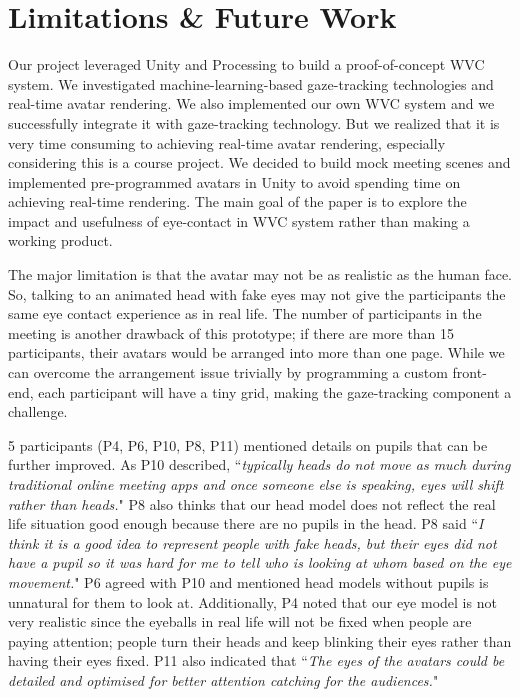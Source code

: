 
\section{Limitations \& Future Work}\label{section:lim}

Our project leveraged Unity and Processing to build a proof-of-concept WVC system. We investigated machine-learning-based gaze-tracking technologies and real-time avatar rendering. We also implemented our own WVC system and we successfully integrate it with gaze-tracking technology. But we realized that it is very time consuming to achieving real-time avatar rendering, especially considering this is a course project. We decided to build mock meeting scenes and implemented pre-programmed avatars in Unity to avoid spending time on achieving real-time rendering. The main goal of the paper is to explore the impact and usefulness of eye-contact in WVC system rather than making a working product.

The major limitation is that the avatar may not be as realistic as the human face. So, talking to an animated head with fake eyes may not give the participants the same eye contact experience as in real life. The number of participants in the meeting is another drawback of this prototype; if there are more than 15 participants, their avatars would be arranged into more than one page. While we can overcome the arrangement issue trivially by programming a custom front-end, each participant will have a tiny grid, making the gaze-tracking component a challenge. 

5 participants (P4, P6,  P10, P8, P11) mentioned details on pupils that can be further improved. As P10 described,  ``\textit{typically heads do not move as much during traditional online meeting apps and once someone else is speaking, eyes will shift rather than heads.}" P8 also thinks that our head model does not reflect the real life situation good enough because there are no pupils in the head. P8 said ``\textit{I think it is a good idea to represent people with fake heads, but their eyes did not have a pupil so it was hard for me to tell who is looking at whom based on the eye movement.}" P6 agreed with P10 and mentioned head models without pupils is unnatural for them to look at. Additionally, P4 noted that our eye model is not very realistic since the eyeballs in real life will not be fixed when people are paying attention; people turn their heads and keep blinking their eyes rather than having their eyes fixed. P11 also indicated that ``\textit{The eyes of the avatars could be detailed and optimised for better attention catching for the audiences.}"

